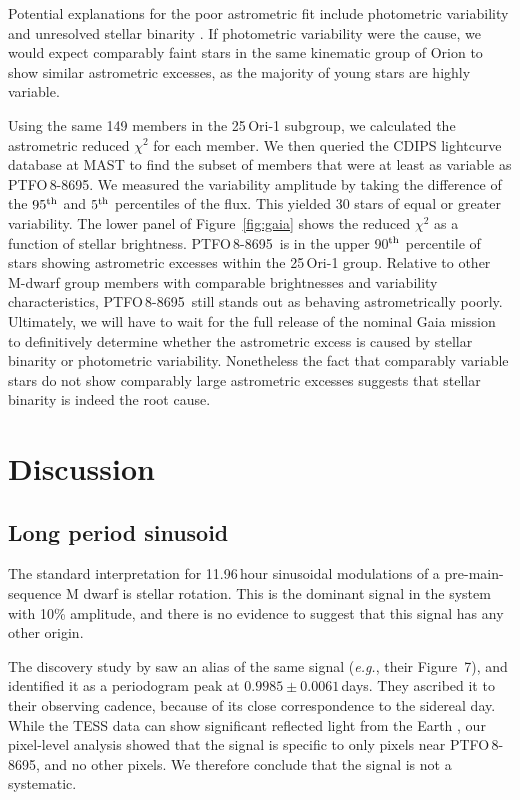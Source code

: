 \documentclass[12pt,twocolumn,tighten]{aastex62}
\newcommand{\ptfo}{PTFO$\,$8-8695}
\begin{document}
Potential explanations for the poor astrometric fit include
photometric variability and unresolved stellar binarity \citep[{\it
e.g.},][]{rizzuto_ZEIT8_2018,belokurov_unresolved_2020}.  If
photometric variability were the cause, we would expect comparably
faint stars in the same kinematic group of Orion to show similar
astrometric excesses, as the majority of young stars are highly
variable.

Using the same 149 members in the 25$\,$Ori-1 subgroup, we calculated
the astrometric reduced $\chi^2$ for each member.  We then queried the
CDIPS lightcurve database at MAST \citep{bouma_cluster_2019} to find
the subset of members that were at least as variable as \ptfo.
We measured the variability amplitude by taking the difference of the
$95^{\rm th}$ and $5^{\rm th}$ percentiles of the flux.
This yielded 30 stars of equal or greater variability.
The lower panel of Figure~\ref{fig:gaia} shows the
reduced $\chi^2$ as a function of stellar brightness.  \ptfo\ is in
the upper 90$^{\rm th}$ percentile of stars showing astrometric
excesses within the 25$\,$Ori-1 group.  Relative to other M-dwarf
group members with comparable brightnesses and variability
characteristics, \ptfo\ still stands out as behaving astrometrically
poorly.  Ultimately, we will have to wait for the full release of the
nominal Gaia mission to definitively determine whether the astrometric
excess is caused by stellar binarity or photometric variability.
Nonetheless the fact that comparably variable stars do not show
comparably large astrometric excesses suggests that stellar binarity
is indeed the root cause.


\section{Discussion}
\label{sec:discussion}

\subsection{Long period sinusoid}

The standard interpretation for 11.96$\,$hour sinusoidal modulations
of a pre-main-sequence M dwarf is stellar rotation.  This is the
dominant signal in the system with 10\% amplitude, and there is no
evidence to suggest that this signal has any other origin.

The discovery study by \citet{van_eyken_ptf_2012} saw an alias of the
same signal ({\it e.g.}, their Figure~7), and identified it as a
periodogram peak at $0.9985 \pm 0.0061\,$days. They ascribed it to
their observing cadence, because of its close correspondence to the
sidereal day.  While the TESS data can show significant reflected
light from the Earth \citep[{\it e.g.},][]{luger_tess_2019}, our
pixel-level analysis showed that the signal is specific to only pixels
near \ptfo, and no other pixels.  We therefore conclude that the
signal is not a systematic.
\end{document}
